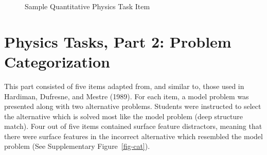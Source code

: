 \documentclass[
  letterpaper,
  DIV=11,
  numbers=noendperiod]{scrreprt}
\begin{document}
\begin{figure}[!hp]

\caption{\label{fig-quant}Sample Quantitative Physics Task Item}


\end{figure}%

\section{Physics Tasks, Part 2: Problem
Categorization}\label{physics-tasks-part-2-problem-categorization}

This part consisted of five items adapted from, and similar to, those
used in Hardiman, Dufresne, and Mestre (1989). For each item, a model
problem was presented along with two alternative problems. Students were
instructed to select the alternative which is solved most like the model
problem (deep structure match). Four out of five items contained surface
feature distractors, meaning that there were surface features in the
incorrect alternative which resembled the model problem (See
Supplementary Figure~\ref{fig-cat}).
\end{document}
